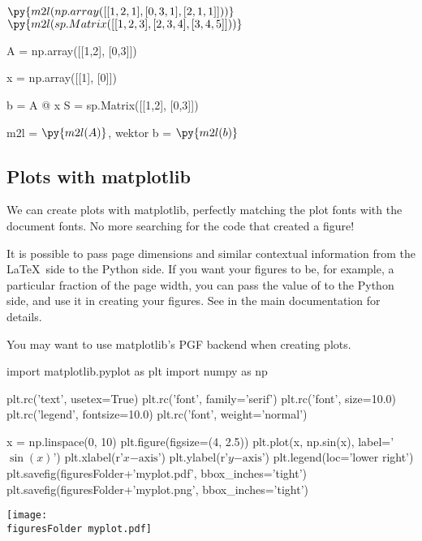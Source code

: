 \documentclass[11pt]{article}
\newcommand{\figuresFolder}{figures/}
\begin{document}
$\py{m2l(np.array([[1,2,1],
               [0,3,1],
               [2,1,1]]))}$
$\py{m2l(sp.Matrix([[1,2,3],
                 [2,3,4],
                 [3,4,5]]))}$

\begin{pycode}
A = np.array([[1,2],
               [0,3]])

x = np.array([[1],
               [0]])

b = A @ x
S = sp.Matrix([[1,2],
               [0,3]])
\end{pycode}

m2l = $\py{m2l(A)}$, 
\quad
wektor b = $\py{m2l(b)}$
\quad 
\subsection{Plots with matplotlib}

We can create plots with matplotlib, perfectly matching the plot fonts with the document fonts.  No more searching for the code that created a figure!

It is possible to pass page dimensions and similar contextual information from the \LaTeX\ side to the Python side.  If you want your figures to be, for example, a particular fraction of the page width, you can pass the value of  to the Python side, and use it in creating your figures.  See  in the main documentation for details.

You may want to use matplotlib's PGF backend when creating plots.

\begin{pyblock}
import matplotlib.pyplot as plt
import numpy as np

plt.rc('text', usetex=True)
plt.rc('font', family='serif')
plt.rc('font', size=10.0)
plt.rc('legend', fontsize=10.0)
plt.rc('font', weight='normal')

x = np.linspace(0, 10)
plt.figure(figsize=(4, 2.5))
plt.plot(x, np.sin(x), label='$\sin(x)$')
plt.xlabel(r'$x\mathrm{-axis}$')
plt.ylabel(r'$y\mathrm{-axis}$')
plt.legend(loc='lower right')
plt.savefig(figuresFolder+'myplot.pdf', bbox_inches='tight')
plt.savefig(figuresFolder+'myplot.png', bbox_inches='tight')
\end{pyblock}

\begin{center}
\texttt{[image: \\figuresFolder myplot.pdf]}
\end{center}
\end{document}
